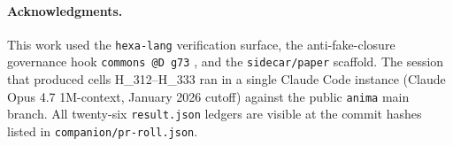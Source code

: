 \documentclass[11pt,a4paper]{article}
\begin{document}
\paragraph{Acknowledgments.}
This work used the \texttt{hexa-lang} verification surface, the
anti-fake-closure governance hook \texttt{commons @D g73}
\citep{anima_g73}, and the \texttt{sidecar/paper} scaffold. The
session that produced cells H\_312--H\_333 ran in a single Claude
Code instance (Claude Opus 4.7 1M-context, January 2026 cutoff)
against the public \texttt{anima} main branch. All twenty-six
\texttt{result.json} ledgers are visible at the commit hashes listed
in \texttt{companion/pr-roll.json}.



\end{document}
